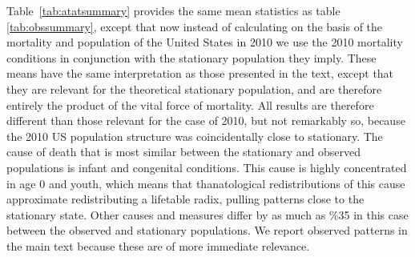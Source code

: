 \documentclass{article}
\begin{document}
\begin{appendices}
Table~\ref{tab:atatsummary} provides the same mean statistics as table
\ref{tab:obssummary}, except that now instead of calculating on the basis of the
mortality and population of the United States in 2010 we use the 2010 mortality
conditions in conjunction with the stationary population they imply. These means
have the same interpretation as those presented in the text, except that they
are relevant for the theoretical stationary population, and are
therefore entirely the product of the vital force of mortality. All results are
therefore different than those relevant for the case of 2010, but not
remarkably so, because the 2010 US population structure was
coincidentally close to stationary. The cause of death that is most similar
between the stationary and observed populations is infant and congenital
conditions. This cause is highly concentrated in age 0 and youth, which means
that thanatological redistributions of this cause approximate redistributing a
lifetable radix, pulling patterns close to the stationary state. Other causes
and measures differ by as much as \%35 in this case between the observed and
stationary populations. We report observed patterns in the main text because
these are of more immediate relevance.



\end{appendices}
\end{document}
